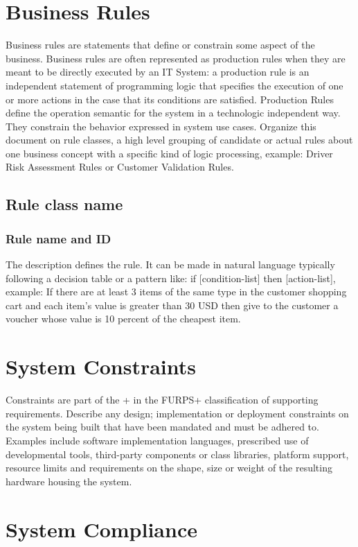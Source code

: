 \section{Business Rules}
Business rules are statements that define or constrain some aspect of the business. Business rules are often represented as production rules when they are meant to be directly executed by an IT System: a production rule is an independent statement of programming logic that specifies the execution of one or more actions in the case that its conditions are satisfied. Production Rules define the operation semantic for the system in a technologic independent way. They constrain the behavior expressed in system use cases.
Organize this document on rule classes, a high level grouping of candidate or actual rules about one business concept with a specific kind of logic processing, example: Driver Risk Assessment Rules or Customer Validation Rules.

\subsection{Rule class name}

\subsubsection{Rule name and ID}
The description defines the rule. It can be made in natural language typically following a decision table or a pattern like:  if [condition-list] then [action-list], example: 
If there are at least 3 items of the same type in the customer shopping cart and each item’s value is greater than 30 USD then give to the customer a voucher whose value is 10 percent of the cheapest item.

\section{System Constraints}

Constraints are part of the + in the FURPS+ classification of supporting requirements. Describe any design; implementation or deployment constraints on the system being built that have been mandated and must be adhered to. Examples include software implementation languages, prescribed use of developmental tools, third-party components or class libraries, platform support, resource limits and requirements on the shape, size or weight of the resulting hardware housing the system.

\section{System Compliance}

